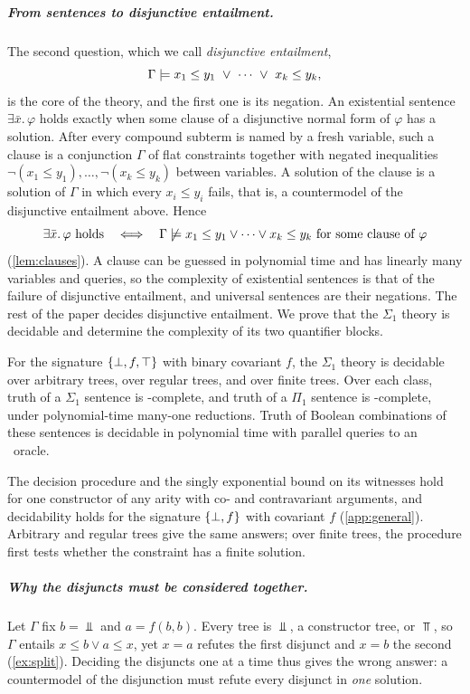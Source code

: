 \subparagraph*{From sentences to disjunctive entailment.}
The second question, which we call \emph{disjunctive entailment},
\[
  \Gamma\entails x_1\le y_1\ \lor\ \cdots\ \lor\ x_k\le y_k ,
\]
is the core of the theory, and the first one is its negation. An existential sentence
$\exists\bar x.\,\varphi$ holds exactly when some clause of a disjunctive normal form of
$\varphi$ has a solution. After every compound subterm is named by a fresh variable, such
a clause is a conjunction $\Gamma$ of flat constraints together with negated inequalities
$\neg(x_1\le y_1),\dots,\neg(x_k\le y_k)$ between variables. A solution of the clause is a
solution of $\Gamma$ in which every $x_i\le y_i$ fails, that is, a countermodel of the
disjunctive entailment above. Hence
\[
  \exists\bar x.\,\varphi\ \text{holds}
  \quad\Longleftrightarrow\quad
  \Gamma\not\models x_1\le y_1\lor\cdots\lor x_k\le y_k
  \ \text{for some clause of}\ \varphi
\]
(\cref{lem:clauses}). A clause can be guessed in polynomial time and has linearly many
variables and queries, so the complexity of existential sentences is that of the failure of
disjunctive entailment, and universal sentences are their negations. The rest of the paper
decides disjunctive entailment. We prove that the $\Sigma_1$ theory is decidable and
determine the complexity of its two quantifier blocks.

\begin{theorem}\label{thm:main}
For the signature $\{\bot,f,\top\}$ with binary covariant $f$, the $\Sigma_1$ theory
is decidable over arbitrary trees, over regular trees, and over finite
trees. Over each class, truth of a $\Sigma_1$ sentence is \NExp-complete,
and truth of a $\Pi_1$ sentence is \coNExp-complete, under polynomial-time
many-one reductions. Truth of Boolean combinations of these sentences
is decidable in polynomial time with parallel queries to an \NExp\ oracle.
\end{theorem}

The decision procedure and the singly exponential bound on its witnesses hold for one
constructor of any arity with co- and contravariant arguments, and decidability holds for
the signature $\{\bot,f\}$ with covariant $f$ (\cref{app:general}). Arbitrary and regular trees
give the same answers; over finite trees, the procedure first tests whether the constraint
has a finite solution.

\subparagraph*{Why the disjuncts must be considered together.}
Let $\Gamma$ fix $b=\Bot$ and $a=f(b,b)$. Every tree is $\Bot$, a constructor tree, or
$\Top$, so $\Gamma$ entails $x\le b\lor a\le x$, yet $x=a$ refutes the first disjunct and
$x=b$ the second (\cref{ex:split}). Deciding the disjuncts one at a time thus gives the
wrong answer: a countermodel of the disjunction must refute every disjunct in \emph{one}
solution.

